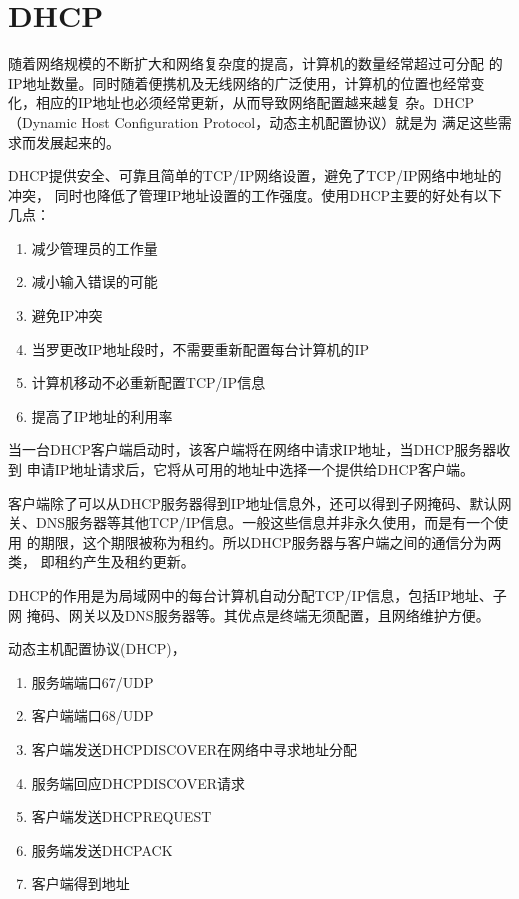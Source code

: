 \section{DHCP}

随着网络规模的不断扩大和网络复杂度的提高，计算机的数量经常超过可分配
的IP地址数量。同时随着便携机及无线网络的广泛使用，计算机的位置也经常变
化，相应的IP地址也必须经常更新，从而导致网络配置越来越复
杂。DHCP（Dynamic Host Configuration Protocol，动态主机配置协议）就是为
满足这些需求而发展起来的。

DHCP提供安全、可靠且简单的TCP/IP网络设置，避免了TCP/IP网络中地址的冲突，
同时也降低了管理IP地址设置的工作强度。使用DHCP主要的好处有以下几点：

\begin{enumerate}[itemsep=0pt,parsep=0pt]
\item 减少管理员的工作量
\item 减小输入错误的可能
\item 避免IP冲突
\item 当罗更改IP地址段时，不需要重新配置每台计算机的IP
\item 计算机移动不必重新配置TCP/IP信息
\item 提高了IP地址的利用率
\end{enumerate}

当一台DHCP客户端启动时，该客户端将在网络中请求IP地址，当DHCP服务器收到
申请IP地址请求后，它将从可用的地址中选择一个提供给DHCP客户端。

客户端除了可以从DHCP服务器得到IP地址信息外，还可以得到子网掩码、默认网
关、DNS服务器等其他TCP/IP信息。一般这些信息并非永久使用，而是有一个使用
的期限，这个期限被称为租约。所以DHCP服务器与客户端之间的通信分为两类，
即租约产生及租约更新。

DHCP的作用是为局域网中的每台计算机自动分配TCP/IP信息，包括IP地址、子网
掩码、网关以及DNS服务器等。其优点是终端无须配置，且网络维护方便。

动态主机配置协议(DHCP)，

\begin{enumerate}[itemsep=0pt,parsep=0pt]
\item 服务端端口67/UDP
\item 客户端端口68/UDP
\item 客户端发送DHCPDISCOVER在网络中寻求地址分配
\item 服务端回应DHCPDISCOVER请求
\item 客户端发送DHCPREQUEST
\item 服务端发送DHCPACK
\item 客户端得到地址
\end{enumerate}

